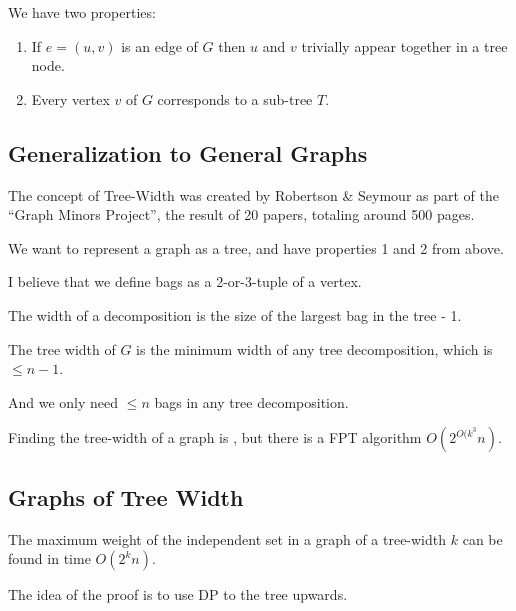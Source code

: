                         We have two properties:
                        \begin{enumerate}
                            \item If $e = (u, v)$ is an edge of $G$ then $u$ and $v$ trivially appear together in a tree node.
                            \item Every vertex $v$ of $G$ corresponds to a sub-tree $T$.
                        \end{enumerate}
                    \subsection{Generalization to General Graphs} %
                    \label{sub:generalization_to_general_graphs}
                        The concept of Tree-Width was created by Robertson \& Seymour as part of the ``Graph Minors Project'', the result of 20 papers, totaling around 500 pages.

                        We want to represent a graph as a tree, and have properties 1 and 2 from above.

                        I believe that we define bags as a 2-or-3-tuple of a vertex.

                        The width of a decomposition is the size of the largest bag in the tree - 1.

                        The tree width of $G$ is the minimum width of any tree decomposition, which is $\le n - 1$.

                        And we only need $\le n$ bags in any tree decomposition.

                        Finding the tree-width of a graph is \nphard, but there is a FPT algorithm $O(2^{O(k^3} n)$.
                \subsection{Graphs of Tree Width} %
                \label{sub:graphs_of_tree_width}
                    The maximum weight of the independent set in a graph of a tree-width $k$ can be found in time $O(2^k n)$.

                    The idea of the proof is to use DP to the tree upwards.

